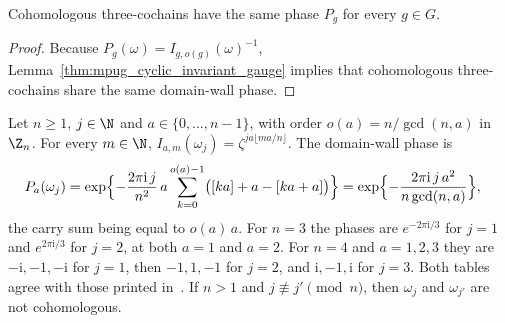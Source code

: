 \begin{lemma}
    \label{thm:asymex_group_cocycle_domain_wall_phase_gauge}
    \leanok
    Cohomologous three-cochains have the same phase $P_g$ for every $g\in G$.
\end{lemma}
\begin{proof}
    \leanok
    Because $P_g(\omega)=I_{g,o(g)}(\omega)^{-1}$,
    Lemma~\ref{thm:mpug_cyclic_invariant_gauge} implies that cohomologous
    three-cochains share the same domain-wall phase.
\end{proof}

\begin{lemma}
    \label{thm:asymex_group_cocycle_cyclic_domain_wall}
    \leanok
    Let $n\geq1$, $j\in\N$ and $a\in\{0,\ldots,n-1\}$, with order
    $o(a)=n/\gcd(n,a)$ in $\Z_n$. For every $m\in\N$,
    $I_{a,m}(\omega_j)=\zeta^{ja\lfloor ma/n\rfloor}$. The domain-wall phase is
    \begin{align}
        P_a(\omega_j)
         & =\exp\Bigl\{-\frac{2\pi\mathrm{i}\,j}{n^2}\,a
        \sum_{k=0}^{o(a)-1}\bigl([ka]+a-[ka+a]\bigr)\Bigr\}
        =\exp\Bigl\{-\frac{2\pi\mathrm{i}\,j\,a^2}{n\gcd(n,a)}\Bigr\},
        \notag
    \end{align}
    the carry sum being equal to $o(a)\,a$. For $n=3$ the phases are
    $e^{-2\pi\mathrm{i}/3}$ for $j=1$ and $e^{2\pi\mathrm{i}/3}$ for $j=2$, at
    both $a=1$ and $a=2$. For $n=4$ and $a=1,2,3$ they are
    $-\mathrm{i},-1,-\mathrm{i}$ for $j=1$, then $-1,1,-1$ for $j=2$, and
    $\mathrm{i},-1,\mathrm{i}$ for $j=3$. Both tables agree with those printed
    in~\cite[Section~IV.D]{GarreRubioSchuch2024DomainWall}. If $n>1$ and
    $j\not\equiv j'\pmod n$, then $\omega_j$ and $\omega_{j'}$ are not
    cohomologous.
\end{lemma}
